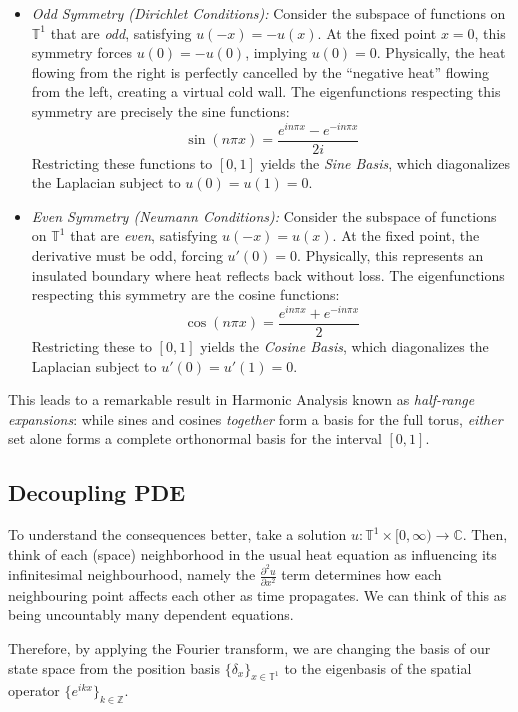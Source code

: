 \documentclass{article}
\newcommand{\C}{{\mathbb{C}}}
\newcommand{\T}{{\mathbb{T}}}
\newcommand{\Z}{{\mathbb{Z}}}
\begin{document}
\begin{itemize}
    \item \emph{Odd Symmetry (Dirichlet Conditions):}
    Consider the subspace of functions on $\T^1$ that are \emph{odd}, satisfying $u(-x) = -u(x)$. At the
    fixed point $x=0$, this symmetry forces $u(0) = -u(0)$, implying $u(0) = 0$. Physically, the heat
    flowing from the right is perfectly cancelled by the ``negative heat'' flowing from the left, creating a
    virtual cold wall. The eigenfunctions respecting this symmetry are precisely the sine functions:
    \[ \sin(n\pi x) = \frac{e^{in\pi x} - e^{-in\pi x}}{2i} \]
    Restricting these functions to $[0,1]$ yields the \emph{Sine Basis}, which diagonalizes the Laplacian
    subject to $u(0)=u(1)=0$.

    \item \emph{Even Symmetry (Neumann Conditions):}
    Consider the subspace of functions on $\T^1$ that are \emph{even}, satisfying $u(-x) = u(x)$. At the
    fixed point, the derivative must be odd, forcing $u'(0) = 0$. Physically, this represents an insulated
    boundary where heat reflects back without loss. The eigenfunctions respecting this symmetry are the cosine
    functions:
    \[ \cos(n\pi x) = \frac{e^{in\pi x} + e^{-in\pi x}}{2} \]
    Restricting these to $[0,1]$ yields the \emph{Cosine Basis}, which diagonalizes the Laplacian subject
    to $u'(0)=u'(1)=0$.
\end{itemize}

This leads to a remarkable result in Harmonic Analysis known as \emph{half-range expansions}: while sines and
cosines \emph{together} form a basis for the full torus, \emph{either} set alone forms a complete orthonormal
basis for the interval $[0,1]$.





\subsection*{Decoupling PDE}

To understand the consequences better, take a solution $u: \T^1\times [0, \infty) \to \C$. Then, think of
each (space) neighborhood in the usual heat equation as influencing its infinitesimal neighbourhood, namely
the $\frac{\partial^2 u}{\partial x^2}$ term determines how each neighbouring point affects each other as
time propagates. We can think of this as being uncountably many dependent equations.

Therefore, by applying the Fourier transform, we are changing the basis of our state space
from the position basis $\{ \delta_x \}_{x \in \T^1}$ to the eigenbasis of the spatial
operator $\{ e^{ikx} \}_{k \in \Z}$.
\end{document}
